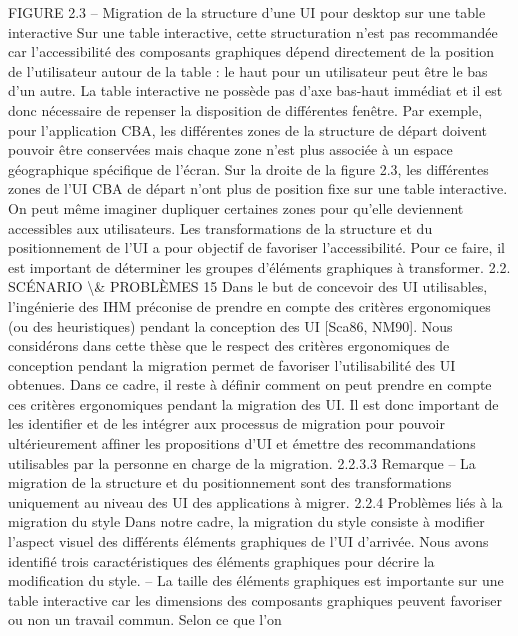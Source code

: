 \documentclass{article}
\begin{document}
FIGURE 2.3 – Migration de la structure d’une UI pour desktop sur une table interactive
Sur une table interactive, cette structuration n’est pas recommand\'{e}e car l’accessibilit\'{e} des composants graphiques d\'{e}pend directement de la position de l’utilisateur autour de la table : le haut pour un
utilisateur peut \^{e}tre le bas d’un autre. La table interactive ne poss\`{e}de pas d’axe bas-haut imm\'{e}diat et
il est donc n\'{e}cessaire de repenser la disposition de diff\'{e}rentes fen\^{e}tre. Par exemple, pour l’application
CBA, les diff\'{e}rentes zones de la structure de d\'{e}part doivent pouvoir \^{e}tre conserv\'{e}es mais chaque zone
n’est plus associ\'{e}e \`{a} un espace g\'{e}ographique sp\'{e}ciﬁque de l’\'{e}cran. Sur la droite de la ﬁgure 2.3, les
diff\'{e}rentes zones de l’UI CBA de d\'{e}part n’ont plus de position ﬁxe sur une table interactive. On peut
m\^{e}me imaginer dupliquer certaines zones pour qu’elle deviennent accessibles aux utilisateurs.
Les transformations de la structure et du positionnement de l’UI a pour objectif de favoriser
l’accessibilit\'{e}. Pour ce faire, il est important de d\'{e}terminer les groupes d’\'{e}l\'{e}ments graphiques \`{a}
transformer.
2.2. SCÉNARIO \textbackslash{}& PROBLÈMES
15
Dans le but de concevoir des UI utilisables, l’ing\'{e}nierie des IHM pr\'{e}conise de prendre en compte
des crit\`{e}res ergonomiques (ou des heuristiques) pendant la conception des UI [Sca86, NM90]. Nous
consid\'{e}rons dans cette th\`{e}se que le respect des crit\`{e}res ergonomiques de conception pendant la migration permet de favoriser l’utilisabilit\'{e} des UI obtenues. Dans ce cadre, il reste \`{a} d\'{e}ﬁnir comment
on peut prendre en compte ces crit\`{e}res ergonomiques pendant la migration des UI. Il est donc important de les identiﬁer et de les int\'{e}grer aux processus de migration pour pouvoir ult\'{e}rieurement
afﬁner les propositions d’UI et \'{e}mettre des recommandations utilisables par la personne en charge de
la migration.
2.2.3.3
Remarque
– La migration de la structure et du positionnement sont des transformations uniquement au niveau des UI des applications \`{a} migrer.
2.2.4
Probl\`{e}mes li\'{e}s \`{a} la migration du style
Dans notre cadre, la migration du style consiste \`{a} modiﬁer l’aspect visuel des diff\'{e}rents \'{e}l\'{e}ments
graphiques de l’UI d’arriv\'{e}e. Nous avons identiﬁ\'{e} trois caract\'{e}ristiques des \'{e}l\'{e}ments graphiques pour
d\'{e}crire la modiﬁcation du style.
– La taille des \'{e}l\'{e}ments graphiques est importante sur une table interactive car les dimensions
des composants graphiques peuvent favoriser ou non un travail commun. Selon ce que l’on
\end{document}
